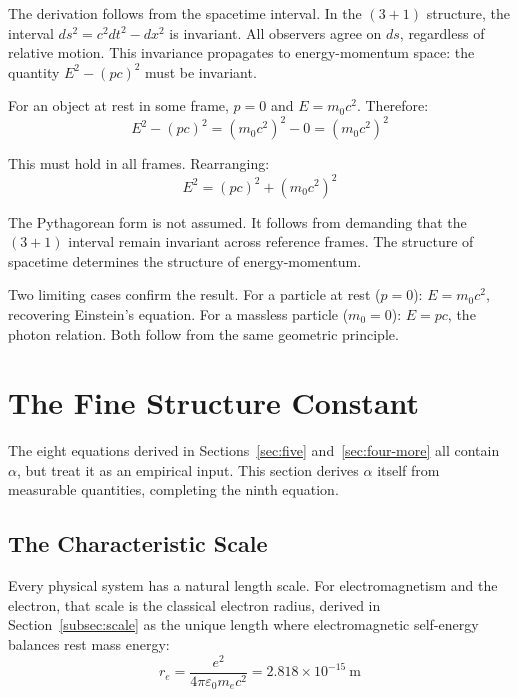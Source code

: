 \documentclass[aps,prd,preprint,superscriptaddress,showpacs,preprintnumbers,amsmath,amssymb,nofootinbib]{revtex4-2}
\begin{document}
The derivation follows from the spacetime interval. In the $(3+1)$ structure, the interval $ds^2 = c^2 dt^2 - dx^2$ is invariant. All observers agree on $ds$, regardless of relative motion. This invariance propagates to energy-momentum space: the quantity $E^2 - (pc)^2$ must be invariant.

For an object at rest in some frame, $p = 0$ and $E = m_0 c^2$. Therefore:
\begin{equation}
E^2 - (pc)^2 = (m_0 c^2)^2 - 0 = (m_0 c^2)^2
\end{equation}

This must hold in all frames. Rearranging:
\begin{equation}
E^2 = (pc)^2 + (m_0 c^2)^2
\end{equation}

The Pythagorean form is not assumed. It follows from demanding that the $(3+1)$ interval remain invariant across reference frames. The structure of spacetime determines the structure of energy-momentum.

Two limiting cases confirm the result. For a particle at rest ($p = 0$): $E = m_0 c^2$, recovering Einstein's equation. For a massless particle ($m_0 = 0$): $E = pc$, the photon relation. Both follow from the same geometric principle.

\section{The Fine Structure Constant}
\label{sec:alpha}

The eight equations derived in Sections~\ref{sec:five} and~\ref{sec:four-more} all contain $\alpha$, but treat it as an empirical input. This section derives $\alpha$ itself from measurable quantities, completing the ninth equation.

\subsection{The Characteristic Scale}
\label{subsec:alpha-scale}

Every physical system has a natural length scale. For electromagnetism and the electron, that scale is the classical electron radius, derived in Section~\ref{subsec:scale} as the unique length where electromagnetic self-energy balances rest mass energy:
\begin{equation}
r_e = \frac{e^2}{4\pi\varepsilon_0 m_e c^2} = 2.818 \times 10^{-15}~\text{m}
\end{equation}
\end{document}
